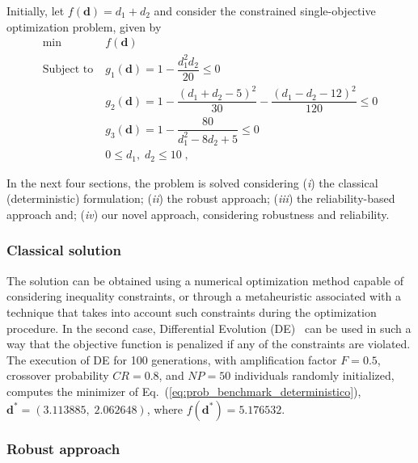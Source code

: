 \documentclass[final,5p,times,twocolumn,numbers]{elsarticle}
\begin{document}
Initially, let $ f \left( \mathbf{d} \right) = d_{1} + d_{2} $ and consider the constrained single-objective optimization problem, given by
%
\begin{equation} \label{eq:prob_benchmark_deterministico}
\begin{split}
\min \; &f \left( \mathbf{d} \right)\\
\textrm{Subject to} \; &g_{1} \left( \mathbf{d} \right) = 1 - \dfrac{d_{1}^{2} d_{2}}{20} \leq 0\\
\phantom{Subject to} \; &g_{2} \left( \mathbf{d} \right) = 1 - \dfrac{\left( d_{1} + d_{2} - 5 \right)^{2}}{30} - \dfrac{\left( d_{1} - d_{2} - 12 \right)^{2}}{120} \leq 0\\
\phantom{Subject to} \; &g_{3} \left( \mathbf{d} \right) = 1 - \dfrac{80}{d_{1}^{2} - 8 d_{2} + 5} \leq 0\\
\phantom{Subject to} \; &0 \leq d_{1}, \; d_{2} \leq 10 \; ,
\end{split}
\end{equation}

\noindent In the next four sections, the problem is solved considering (\textit{i}) the classical (deterministic) formulation; (\textit{ii}) the robust approach; (\textit{iii}) the reliability-based approach and; (\textit{iv}) our novel approach, considering robustness and reliability.

\subsubsection{Classical solution}

The solution can be obtained using a numerical optimization method capable of considering inequality constraints, or through a metaheuristic associated with a technique that takes into account such constraints during the optimization procedure. In the second case, Differential Evolution (DE)~\cite{bib:storn1997} can be used in such a way that the objective function is penalized if any of the constraints are violated. The execution of DE for 100 generations, with amplification factor $ F = 0.5 $, crossover probability $ CR = 0.8 $, and $ NP = 50 $ individuals randomly initialized, computes the minimizer of Eq.~(\ref{eq:prob_benchmark_deterministico}), $ \mathbf{d}^{*} = \left( 3.113885, \; 2.062648 \right) $, where $ f \left( \mathbf{d}^{*} \right) = 5.176532 $.

\subsubsection{Robust approach}
\end{document}
